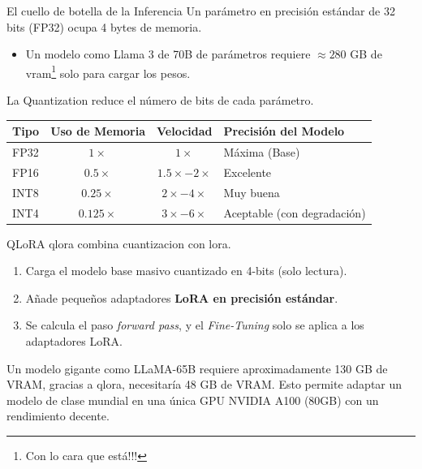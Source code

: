 \begin{frame}{El cuello de botella de la Inferencia}
Un parámetro en precisión estándar de 32 bits (FP32) ocupa 4 bytes de memoria.
\begin{itemize}
    \item Un modelo como Llama 3 de 70B de parámetros requiere $\approx 280$ GB de \gls{vram}\footnote{Con lo cara que está!!!} solo para cargar los pesos.
\end{itemize}

La \alert{Quantization} reduce el número de bits de cada parámetro.

\begin{table}[]
\centering
\small
\begin{tabular}{|l|c|c|l|}
\hline
\textbf{Tipo} & \textbf{Uso de Memoria} & \textbf{Velocidad} & \textbf{Precisión del Modelo} \\ \hline
FP32 & $1\times$ & $1\times$ & Máxima (Base) \\ \hline
FP16 & $0.5\times$ & $1.5\times - 2\times$ & Excelente \\ \hline
INT8 & $0.25\times$ & $2\times - 4\times$ & Muy buena \\ \hline
INT4 & $0.125\times$ & $3\times - 6\times$ & Aceptable (con degradación) \\ \hline
\end{tabular}
\end{table}
\end{frame}

\begin{frame}{QLoRA}
\alert{\gls{qlora}} combina cuantizacion con \gls{lora}.

\begin{enumerate}
    \item Carga el modelo base masivo cuantizado en \alert{4-bits} (solo lectura).
    \item Añade pequeños adaptadores \textbf{LoRA en precisión estándar}.
    \item Se calcula el paso \textit{forward pass}, y el \textit{Fine-Tuning} solo se aplica a los \alert{adaptadores LoRA}.
\end{enumerate}

Un modelo gigante como LLaMA-65B requiere aproximadamente \alert{130 GB de VRAM}, gracias a \alert{\gls{qlora}}, necesitaría \alert{48 GB de VRAM}. Esto permite adaptar un modelo de clase mundial en una única GPU NVIDIA A100 (80GB) con un rendimiento decente.
\end{frame}

